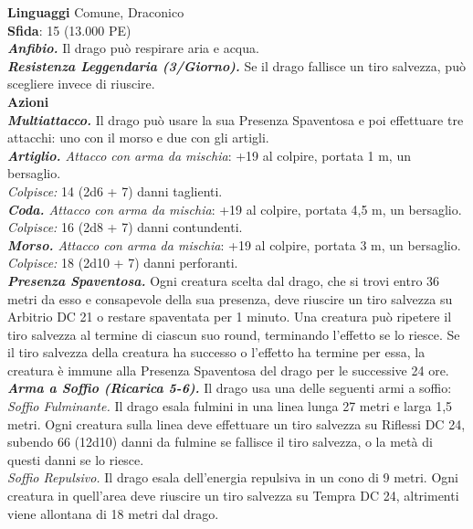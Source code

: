 \begin{multicols}{2}
\textbf{Linguaggi} Comune, Draconico\\
\textbf{Sfida}: 15 (13.000 PE)\smallskip\\
\emph{\textbf{Anfibio.}} Il drago può respirare aria e acqua.\\
\emph{\textbf{Resistenza Leggendaria (3/Giorno).}} Se il drago fallisce un tiro salvezza, può scegliere invece di riuscire.\\
\smallskip\textbf{Azioni}\\
\emph{\textbf{Multiattacco.}} Il drago può usare la sua Presenza Spaventosa e poi effettuare tre attacchi: uno con il morso e due con gli artigli.\\
\emph{\textbf{Artiglio.} Attacco con arma da mischia}: +19 al colpire, portata 1 m, un bersaglio.\\
\emph{Colpisce:} 14 (2d6 + 7) danni taglienti.\\
\emph{\textbf{Coda.} Attacco con arma da mischia}: +19 al colpire, portata 4,5 m, un bersaglio.\\
\emph{Colpisce:} 16 (2d8 + 7) danni contundenti.\\
\emph{\textbf{Morso.} Attacco con arma da mischia}: +19 al colpire, portata 3 m, un bersaglio.\\
\emph{Colpisce:} 18 (2d10 + 7) danni perforanti.\\
\emph{\textbf{Presenza Spaventosa.}} Ogni creatura scelta dal drago, che si trovi entro 36 metri da esso e consapevole della sua presenza, deve riuscire un tiro salvezza su Arbitrio DC  21 o restare spaventata per 1 minuto. Una creatura può ripetere il tiro salvezza al termine di ciascun suo round, terminando l'effetto se lo riesce. Se il tiro salvezza della creatura ha successo o l'effetto ha termine per essa, la creatura è immune alla Presenza Spaventosa del drago per le successive 24 ore.\\
\emph{\textbf{Arma a Soffio (Ricarica 5-6).}} Il drago usa una delle seguenti armi a soffio:\\
\emph{Soffio Fulminante.} Il drago esala fulmini in una linea lunga 27 metri e larga 1,5 metri. Ogni creatura sulla linea deve effettuare un tiro salvezza su Riflessi DC  24, subendo 66 (12d10) danni da fulmine se fallisce il tiro salvezza, o la metà di questi danni se lo riesce.\\
\emph{Soffio Repulsivo.} Il drago esala dell'energia repulsiva in un cono di 9 metri. Ogni creatura in quell'area deve riuscire un tiro salvezza su Tempra DC  24, altrimenti viene allontana di 18 metri dal drago.\\


\end{multicols}

